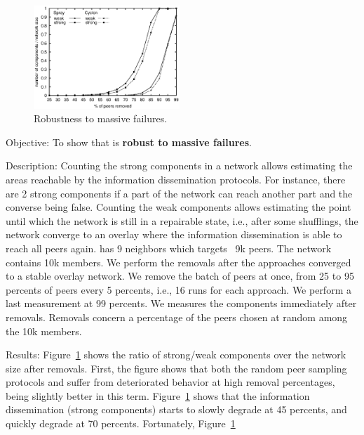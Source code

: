 \ \\

\begin{figure}
  \centering
  \includegraphics[width=0.49\textwidth]{img/resilience.eps}
  \caption{\label{fig:resilience}Robustness to massive failures.}
\end{figure}

\begin{asparadesc}
\item[Objective:] To show that \SPRAY is \textbf{robust to massive failures}.
\item[Description:] Counting the strong components in a network allows
  estimating the areas reachable by the information dissemination protocols. For
  instance, there are 2 strong components if a part of the network can reach
  another part and the converse being false.  Counting the weak components
  allows estimating the point until which the network is still in a repairable
  state, i.e., after some shufflings, the network converge to an overlay where
  the information dissemination is able to reach all peers again. \CYCLON has 9
  neighbors which targets ~9k peers. The network contains 10k members. We
  perform the removals after the approaches converged to a stable overlay
  network. We remove the batch of peers at once, from 25 to 95 percents of peers
  every 5 percents, i.e., 16 runs for each approach. We perform a last
  measurement at 99 percents. We measures the components immediately after
  removals. Removals concern a percentage of the peers chosen at random among
  the 10k members.
\item[Results:] Figure~\ref{fig:resilience} shows the ratio of strong/weak
  components over the network size after removals. First, the figure shows
  that both the random peer sampling protocols \SPRAY and \CYCLON suffer from
  deteriorated behavior at high removal percentages, \CYCLON being slightly
  better in this term. Figure~\ref{fig:resilience} shows that the information
  dissemination (strong components) starts to slowly degrade at 45 percents,
  and quickly degrade at 70 percents. Fortunately, Figure~\ref{fig:resilience}

\end{asparadesc}
